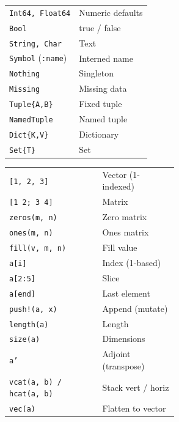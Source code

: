 \documentclass[10pt]{extarticle}
\begin{document}
\begin{multicols}{2}
\begin{tabularx}{\linewidth}{@{}l@{\enspace}Y@{}}
\texttt{Int64, Float64}              & Numeric defaults \\
\texttt{Bool}                        & true / false \\
\texttt{String, Char}               & Text \\
\texttt{Symbol} (\texttt{:name})    & Interned name \\
\texttt{Nothing}                     & Singleton \\
\texttt{Missing}                     & Missing data \\
\texttt{Tuple\{A,B\}}               & Fixed tuple \\
\texttt{NamedTuple}                  & Named tuple \\
\texttt{Dict\{K,V\}}                & Dictionary \\
\texttt{Set\{T\}}                   & Set \\
\end{tabularx}

\begin{tabularx}{\linewidth}{@{}>{\raggedright\arraybackslash}p{0.55\linewidth}@{\enspace}Y@{}}
\texttt{[1, 2, 3]}                   & Vector (1-indexed) \\
\texttt{[1 2; 3 4]}                  & Matrix \\
\texttt{zeros(m, n)}                 & Zero matrix \\
\texttt{ones(m, n)}                  & Ones matrix \\
\texttt{fill(v, m, n)}              & Fill value \\
\texttt{a[i]}                        & Index (1-based) \\
\texttt{a[2:5]}                      & Slice \\
\texttt{a[end]}                      & Last element \\
\texttt{push!(a, x)}                & Append (mutate) \\
\texttt{length(a)}                   & Length \\
\texttt{size(a)}                     & Dimensions \\
\texttt{a'}                          & Adjoint (transpose) \\
\texttt{vcat(a, b) / hcat(a, b)}   & Stack vert / horiz \\
\texttt{vec(a)}                      & Flatten to vector \\
\end{tabularx}


\end{multicols}
\end{document}
